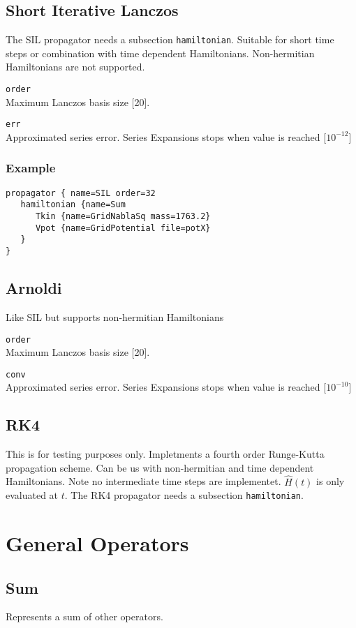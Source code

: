 \documentclass[a4paper,12pt]{scrbook}
\newcommand{\option}[2]{\item \texttt{#1}\\ #2}
\begin{document}
\subsection{Short Iterative Lanczos}
The SIL propagator \cite{Tannor,Leforestier91} needs a subsection \verb|hamiltonian|.
Suitable for short time steps or combination with time dependent Hamiltonians.
Non-hermitian Hamiltonians are not supported.
\begin{options}
 \option{order}{Maximum Lanczos basis size [20].}
 \option{err}{Approximated series error. Series Expansions stops when value is reached [$10^{-12}$]}
\end{options}

\subsubsection*{Example}
\begin{verbatim}
propagator { name=SIL order=32
   hamiltonian {name=Sum
      Tkin {name=GridNablaSq mass=1763.2}
      Vpot {name=GridPotential file=potX}
   }
}
\end{verbatim}

\subsection{Arnoldi}
Like SIL but supports non-hermitian Hamiltonians

\begin{options}
 \option{order}{Maximum Lanczos basis size [20].}
 \option{conv}{Approximated series error. Series Expansions stops when value is reached [$10^{-10}$]}
\end{options}

\subsection{RK4}
This is for testing purposes only. Impletments a fourth order Runge-Kutta propagation scheme.
Can be us with non-hermitian and time dependent Hamiltonians. Note no intermediate time steps
are implementet. $\hat H(t)$ is only evaluated at $t$.
The RK4 propagator \cite{needed} needs a subsection \verb|hamiltonian|.

\section{General Operators}

\subsection{Sum}
Represents a sum of other operators.
\end{document}
